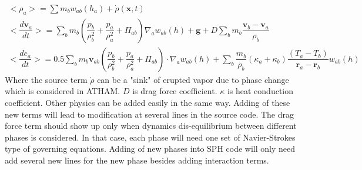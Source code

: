 \documentclass[10pt,a4paper]{article}
\begin{document}
\begin{eqnarray}
<\rho_a> = \sum m_b w_{ab} (h_a) + \dot{\rho}(\textbf{x},t)\label{eq:ns-source-sph-d} \\
<\dfrac{d \textbf{v}_a}{d t}>= \sum_b m_b (\dfrac{p_b}{\rho_b^2} + \dfrac{p_a}{\rho_a^2} + \Pi_{ab}) \nabla_a w_{a b}(h) +\textbf{g} + D \sum	_b m_b \dfrac{\textbf{v}_b - \textbf{v}_a}{\rho_b} \label{eq:ns-drag-sph-v} \\
<\dfrac{d e_a}{d t}>=
 0.5\sum_b m_b \textbf{v}_{a b}(\dfrac{p_b}{\rho_b^2} + \dfrac{p_a}{\rho_a^2} + \Pi_{ab}) \cdot \nabla_a w_{a b}(h) + \sum_b \dfrac{m_b}{\rho_b}(\kappa_a + \kappa_b) \dfrac{(T_a - T_b)}{\textbf{r}_a - \textbf{r}_b} w_{ab}(h) \label{eq:ns-conduction-sph-e}
\end{eqnarray}
Where the source term $\dot{\rho}$ can be a "sink" of erupted vapor due to phase change which is considered in ATHAM\citep{oberhuber1998volcanic}. $D$ is drag force coefficient. $\kappa$ is heat conduction coefficient. Other physics can be added easily in the same way. Adding of these new terms will lead to modification at several lines in the source code. The drag force term should show up only when dynamics dis-equilibrium between different phases is considered. In that case, each phase will need one set of Navier-Strokes type of governing equations. Adding of new phases into SPH code will only need add several new lines for the new phase besides adding interaction terms.
\end{document}
